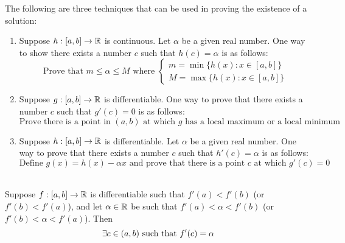 \begin{remark}
    The following are three techniques that can be used in proving the existence of a solution:
    \begin{enumerate}
        \item Suppose $h:[a,b] \to \mathbb{R}$ is continuous. Let $\alpha$ be a given real number. One way to show there exists a number $c$ such that $h(c) = \alpha$ is as follows:
        $$
        \text{Prove that $m \leq \alpha \leq M$ where }
        \begin{cases*}
            m = \min \{h(x) : x \in [a,b]\} \\
            M = \max \{h(x) : x \in [a,b]\}
        \end{cases*}
        $$

        \item Suppose $g:[a,b] \to \mathbb{R}$ is differentiable. One way to prove that there exists a number $c$ such that $g'(c) = 0$ is as follows:
        $$
        \text{Prove there is a point in $(a,b)$ at which $g$ has a local maximum or a local minimum}
        $$

        \item Suppose $h:[a,b] \to \mathbb{R}$ is differentiable. Let $\alpha$ be a given real number. One way to prove that there exists a number $c$ such that $h'(c) = \alpha$ is as follows:
        $$
        \text{Define $g(x)=h(x) - \alpha x$ and prove that there is a point $c$ at which $g'(c) = 0$}
        $$
    \end{enumerate}
\end{remark}

\begin{theorem} \leavevmode\\
    \label{Thm5.12}
    Suppose $f:[a,b] \to \mathbb{R}$ is differentiable such that $f'(a) < f'(b)$ (or $f'(b) < f'(a)$), and let $\alpha \in \mathbb{R}$ be such that $f'(a) < \alpha < f'(b)$ (or $f'(b) < \alpha < f'(a)$). Then
    $$
    \exists c \in (a,b) \text{ such that } f'(c) = \alpha
    $$
\end{theorem}

